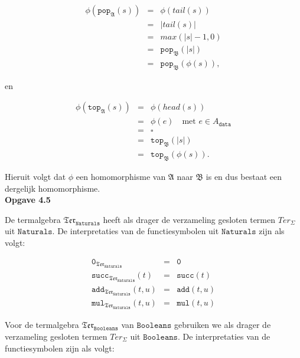 \documentclass[a4paper,11pt]{article}
\begin{document}
\begin{eqnarray*}
\phi(\texttt{pop}_{\mathfrak{A}}(s)) & = & \phi(tail(s)) \\
                                     & = & |tail(s)| \\
                                     & = & max(|s| - 1, 0) \\
                                     & = & \texttt{pop}_{\mathfrak{B}}(|s|) \\
                                     & = & \texttt{pop}_{\mathfrak{B}}(\phi(s)),
\end{eqnarray*}

en

\begin{eqnarray*}
\phi(\texttt{top}_{\mathfrak{A}}(s)) & = & \phi(head(s)) \\
                                     & = & \phi(e) \quad \text{met $e \in A_{\texttt{data}}$} \\
                                     & = & \square \\
                                     & = & \texttt{top}_{\mathfrak{B}}(|s|) \\
                                     & = & \texttt{top}_{\mathfrak{B}}(\phi(s)).
\end{eqnarray*}

Hieruit volgt dat $\phi$ een homomorphisme van $\mathfrak{A}$ naar
$\mathfrak{B}$ is en dus bestaat een dergelijk homomorphisme.\\[2em]


{\bf Opgave 4.5} %

De termalgebra $\mathfrak{Ter}_{\texttt{Naturals}}$ heeft als drager de
verzameling gesloten termen $Ter_{\Sigma}$ uit $\texttt{Naturals}$. De
interpretaties van de functiesymbolen uit $\texttt{Naturals}$ zijn als volgt:

\begin{eqnarray*}
  \texttt{0}_{\mathfrak{Ter}_{\texttt{Naturals}}}        & = & \texttt{0} \\
  \texttt{succ}_{\mathfrak{Ter}_{\texttt{Naturals}}}(t)  & = & \texttt{succ}(t) \\
  \texttt{add}_{\mathfrak{Ter}_{\texttt{Naturals}}}(t,u) & = & \texttt{add}(t,u) \\
  \texttt{mul}_{\mathfrak{Ter}_{\texttt{Naturals}}}(t,u) & = & \texttt{mul}(t,u)
\end{eqnarray*}

Voor de termalgebra $\mathfrak{Ter}_{\texttt{Booleans}}$ van
$\texttt{Booleans}$ gebruiken we als drager de verzameling gesloten termen
$Ter_{\Sigma}$ uit $\texttt{Booleans}$. De interpretaties van de
functiesymbolen zijn als volgt:
\end{document}
